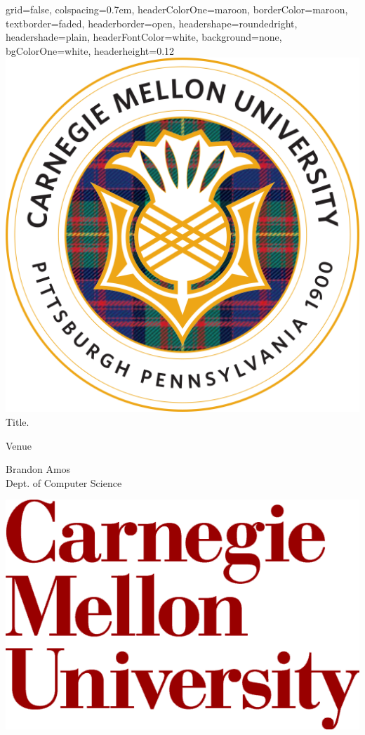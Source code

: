 \documentclass[landscape,specialSize,fontscale=0.3]{baposter}
\begin{document}
\begin{poster}{
    grid=false, %
    colspacing=0.7em, %
    headerColorOne=maroon, borderColor=maroon, %
    textborder=faded, %
    headerborder=open, headershape=roundedright,
    headershade=plain, headerFontColor=white,
    background=none, bgColorOne=white,
    headerheight=0.12\textheight
  }{
    \includegraphics[height=0.12\textheight]{cmu-seal}
  }{
    \sc\Huge Title.
  }{
    \bigskip\Large
    \begin{minipage}{0.4\textwidth}
      Venue
    \end{minipage}
    \begin{minipage}{0.4\textwidth}
      Brandon Amos \\
      Dept. of Computer Science
    \end{minipage}
  }{
    \includegraphics[height=0.12\textheight]{cmu-logo}
  }


\end{poster}
\end{document}
